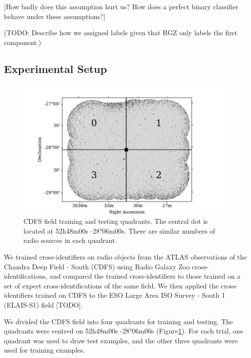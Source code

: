 \documentclass[fleqn,usenatbib,usedcolumn]{mnras}
\begin{document}
    {[}How badly does this assumption hurt us? How does a perfect binary
    classifier behave under these assumptions?{]}

    (TODO: Describe how we assigned labels given that RGZ only labels the
    first component.)

  \subsection{Experimental Setup}\label{experimental-setup}

    \begin{figure}[htbp]
    \centering
    \includegraphics[width=\columnwidth]{images/quadrants.pdf}
    \caption{CDFS field training and testing quadrants. The central dot is
    located at 52h48m00s -28°06m00s. There are similar numbers of radio
    sources in each quadrant.\label{fig:quadrants}}
    \end{figure}

    We trained cross-identifiers on radio objects from the ATLAS
    observations of the Chandra Deep Field - South (CDFS) using Radio Galaxy
    Zoo cross-identifications, and compared the trained cross-identifiers to
    those trained on a set of expert cross-identifications of the same
    field. We then applied the cross-identifiers trained on CDFS to the ESO
    Large Area ISO Survey - South 1 (ELAIS-S1) field {[}TODO{]}.

    We divided the CDFS field into four quadrants for training and testing.
    The quadrants were centred on 52h48m00s -28°06m00s
    ({Figure}\ref{fig:quadrants}). For each trial, one quadrant
    was used to draw test examples, and the other three quadrants were used
    for training examples.
\end{document}
